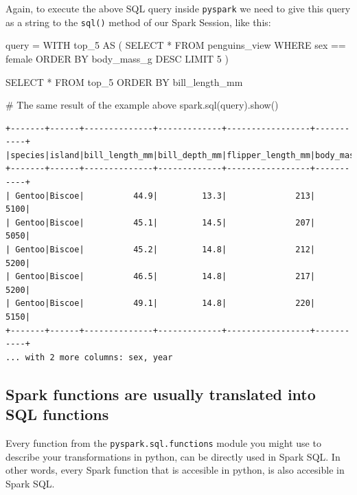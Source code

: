 \documentclass[
  11pt,
  letterpaper,
  DIV=11,
  numbers=noendperiod]{scrreprt}
\newenvironment{Shaded}{\begin{snugshade}}{\end{snugshade}}
\newcommand{\CommentTok}[1]{\textcolor[rgb]{0.37,0.37,0.37}{#1}}
\newcommand{\NormalTok}[1]{\textcolor[rgb]{0.00,0.23,0.31}{#1}}
\newcommand{\OperatorTok}[1]{\textcolor[rgb]{0.37,0.37,0.37}{#1}}
\newcommand{\StringTok}[1]{\textcolor[rgb]{0.13,0.47,0.30}{#1}}
\begin{document}
Again, to execute the above SQL query inside \texttt{pyspark} we need to
give this query as a string to the \texttt{sql()} method of our Spark
Session, like this:

\begin{Shaded}
\begin{Highlighting}[]
\NormalTok{query }\OperatorTok{=} \StringTok{\textquotesingle{}\textquotesingle{}\textquotesingle{}}
\StringTok{WITH top\_5 AS (}
\StringTok{    SELECT *}
\StringTok{    FROM penguins\_view}
\StringTok{    WHERE sex == \textquotesingle{}female\textquotesingle{}}
\StringTok{    ORDER BY body\_mass\_g DESC}
\StringTok{    LIMIT 5}
\StringTok{)}

\StringTok{SELECT *}
\StringTok{FROM top\_5}
\StringTok{ORDER BY bill\_length\_mm}
\StringTok{\textquotesingle{}\textquotesingle{}\textquotesingle{}}

\CommentTok{\# The same result of the example above}
\NormalTok{spark.sql(query).show()}
\end{Highlighting}
\end{Shaded}

\begin{verbatim}
+-------+------+--------------+-------------+-----------------+-----------+
|species|island|bill_length_mm|bill_depth_mm|flipper_length_mm|body_mass_g|
+-------+------+--------------+-------------+-----------------+-----------+
| Gentoo|Biscoe|          44.9|         13.3|              213|       5100|
| Gentoo|Biscoe|          45.1|         14.5|              207|       5050|
| Gentoo|Biscoe|          45.2|         14.8|              212|       5200|
| Gentoo|Biscoe|          46.5|         14.8|              217|       5200|
| Gentoo|Biscoe|          49.1|         14.8|              220|       5150|
+-------+------+--------------+-------------+-----------------+-----------+
... with 2 more columns: sex, year
\end{verbatim}

\hypertarget{sec-sql-expr}{%
\subsection{Spark functions are usually translated into SQL
functions}\label{sec-sql-expr}}

Every function from the \texttt{pyspark.sql.functions} module you might
use to describe your transformations in python, can be directly used in
Spark SQL. In other words, every Spark function that is accesible in
python, is also accesible in Spark SQL.
\end{document}
